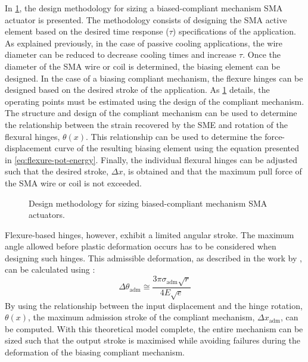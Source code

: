 In \cref{fig:flowchart-pt}, the design methodology for sizing a biased-compliant mechanism SMA actuator is presented. The methodology consists of designing the SMA active element based on the desired time response ($\tau$) specifications of the application. As explained previously, in the case of passive cooling applications, the wire diameter can be reduced to decrease cooling times and increase $\tau$. Once the diameter of the SMA wire or coil is determined, the biasing element can be designed. In the case of a biasing compliant mechanism, the flexure hinges can be designed based on the desired stroke of the application. As \cref{fig:flowchart-pt} details, the operating points must be estimated using the design of the compliant mechanism. The structure and design of the compliant mechanism can be used to determine the relationship between the strain recovered by the SME and rotation of the flexural hinges, $\theta(x)$. This relationship can be used to determine the force-displacement curve of the resulting biasing element using the equation presented in \cref{eq:flexure-pot-energy}. Finally, the individual flexural hinges can be adjusted such that the desired stroke, $\Delta x$, is obtained and that the maximum pull force of the SMA wire or coil is not exceeded.

\begin{figure}[ht]
    \centering
    
    \caption{Design methodology for sizing biased-compliant mechanism SMA actuators.}
    \label{fig:flowchart-pt}
\end{figure}

Flexure-based hinges, however, exhibit a limited angular stroke. The maximum angle allowed before plastic deformation occurs has to be considered when designing such hinges. This admissible deformation, as described in the work by \cite{heneinConceptionStructuresArticulees2005}, can be calculated using :
\begin{equation}\label{eq:theta_adm}
    \Delta\theta_\mathrm{adm}\cong \frac{3\pi \sigma_\text{adm}\sqrt{r}}{4E\sqrt{e}}
\end{equation}
By using the relationship between the input displacement and the hinge rotation, $\theta(x)$, the maximum admission stroke of the compliant mechanism, $\Delta x_\mathrm{adm}$, can be computed. With this theoretical model complete, the entire mechanism can be sized such that the output stroke is maximised while avoiding failures during the deformation of the biasing compliant mechanism.

